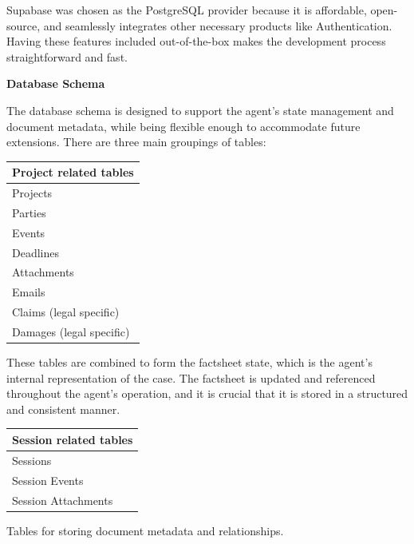 Supabase was chosen as the PostgreSQL provider because it is affordable, open-source, and seamlessly integrates other necessary products like Authentication. Having these features included out-of-the-box makes the development process straightforward and fast.
\bigskip

\textbf{Database Schema}

The database schema is designed to support the agent's state management and document metadata, while being flexible enough to accommodate future extensions. 
There are three main groupings of tables:

\bigskip

\noindent
\begin{minipage}[t]{0.32\textwidth}
  \centering
  \renewcommand{\arraystretch}{1.1}
  \begin{tabular}{|l|}
    \hline
    \textbf{Project related tables} \\ \hline
    Projects                  \\ \hline
    Parties                   \\ \hline
    Events                    \\ \hline
    Deadlines                 \\ \hline
    Attachments               \\ \hline
    Emails                    \\ \hline
    Claims (legal specific)   \\ \hline
    Damages (legal specific)  \\ \hline
  \end{tabular}
  
  \vspace{1em}
  
  \small These tables are combined to form the factsheet state, which is the agent's internal representation of the case. The factsheet is updated and referenced throughout the agent's operation, and it is crucial that it is stored in a structured and consistent manner.
\end{minipage}%
\hfill
\begin{minipage}[t]{0.32\textwidth}
  \centering
  \renewcommand{\arraystretch}{1.1}
  \begin{tabular}{|l|}
    \hline
    \textbf{Session related tables} \\ \hline
    Sessions             \\ \hline
    Session Events       \\ \hline
    Session Attachments  \\ \hline
  \end{tabular}
  
  \vspace{1em}
  
  \small Tables for storing document metadata and relationships.
\end{minipage}%
